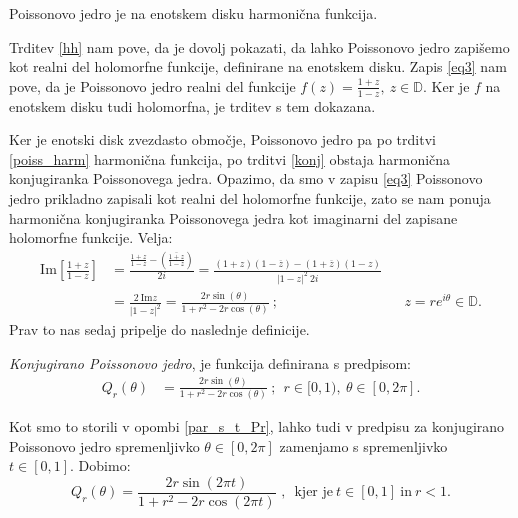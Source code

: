 \documentclass[mat1]{fmfdelo}
\begin{document}
    \begin{trditev}
        \label{poiss_harm}
        Poissonovo jedro je na enotskem disku harmonična funkcija. 
    \end{trditev}
    \begin{dokaz}
        Trditev \ref{hh} nam pove, da je dovolj pokazati, da lahko Poissonovo jedro zapišemo kot realni del holomorfne funkcije, definirane na enotskem disku.
        Zapis \eqref{eq3} nam pove, da je Poissonovo jedro realni del funkcije $f(z) = \frac{1 + z}{1 - z},~z \in \mathbb{D}$. Ker je $f$ na enotskem disku tudi holomorfna, je trditev s tem dokazana. 
    \end{dokaz}

    Ker je enotski disk zvezdasto območje, Poissonovo jedro pa po trditvi \ref{poiss_harm} harmonična funkcija, po trditvi \ref{konj} obstaja harmonična konjugiranka Poissonovega jedra. 
    Opazimo, da smo v zapisu \eqref{eq3} Poissonovo jedro prikladno zapisali kot realni del holomorfne funkcije, zato se nam ponuja harmonična konjugiranka Poissonovega jedra kot imaginarni del zapisane holomorfne funkcije.
    Velja:
    \begin{align*}
        \text{Im}\left[\frac{1 + z}{1-z}\right] &= \frac{\frac{1 + z}{1-z} - \left(\overline{\frac{1 + z}{1-z}}\right)}{2i} = \frac{(1 + z)(1 - \overline{z}) - (1 + \overline{z})(1 - z)}{|1 - z|^2~2i} & & \\ 
        & = \frac{2~\text{Im}z}{|1 - z|^2} = \frac{2 r \sin(\theta)}{1+ r^2 - 2r \cos(\theta)}~; & & z = r e^{i\theta} \in \mathbb{D}.
    \end{align*}
    Prav to nas sedaj pripelje do naslednje definicije. 
    \begin{definicija}
        \emph{Konjugirano Poissonovo jedro}, je funkcija definirana s predpisom:
        \begin{align}
            Q_r(\theta) & = \frac{2 r \sin(\theta)}{1+ r^2 - 2r \cos(\theta)}~;~~r \in [0,1),~\theta \in [0,2\pi].
        \end{align}
    \end{definicija}

    \begin{opomba}
        \label{par_s_t_Qr}
        Kot smo to storili v opombi \ref{par_s_t_Pr}, lahko tudi v predpisu za konjugirano Poissonovo jedro spremenljivko $\theta \in [0,2\pi]$ zamenjamo s spremenljivko $t \in [0,1]$. Dobimo:
        $$
        Q_r(\theta) = \frac{2 r \sin(2 \pi t)}{1+ r^2 - 2r \cos(2 \pi t)}\text{~,~~kjer je}~ t\in [0, 1]~\text{in}~ r < 1.
        $$
    \end{opomba}
\end{document}
